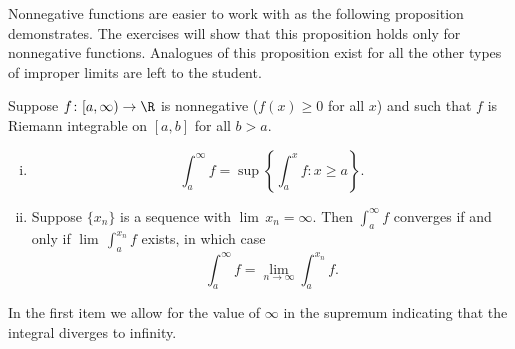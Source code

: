 \documentclass[12pt]{book}
\begin{document}
Nonnegative functions are easier to work with
as the following proposition demonstrates.
The exercises will show that this proposition
holds only for nonnegative functions.
Analogues of this proposition
exist for all the other types of improper limits are left to the
student.

\begin{prop} \label{impropriemann:possimp}
Suppose $f \colon [a,\infty) \to \R$ is nonnegative ($f(x)
\geq 0$ for all $x$) and such that
$f$ is Riemann integrable on $[a,b]$ for all $b > a$.
\begin{enumerate}[(i)]
\item 
\begin{equation*}
\int_a^\infty f = \sup \left\{ \int_a^x f : x \geq a \right\} .
\end{equation*}
\item
Suppose $\{ x_n \}$
is a sequence with $\lim\, x_n = \infty$.
Then
$\int_a^\infty f$ converges if and only if $\lim\, \int_a^{x_n} f$ exists, in
which case
\begin{equation*}
\int_a^\infty f = \lim_{n\to\infty} \int_a^{x_n} f .
\end{equation*}
\end{enumerate}
\end{prop}

In the first item we allow for the value of $\infty$ in the
supremum indicating that the integral diverges to infinity.
\end{document}
